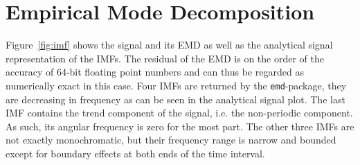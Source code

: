 \documentclass[a4paper,DIV=12,english]{scrartcl}
\begin{document}
\section{Empirical Mode Decomposition}
Figure~\ref{fig:imf} shows the signal and its EMD as well as the analytical signal representation of the IMFs. The residual of the EMD is on the order of the accuracy of 64-bit floating point numbers and can thus be regarded as numerically exact in this case. Four IMFs are returned by the \texttt{emd}-package, they are decreasing in frequency as can be seen in the analytical signal plot. The last IMF contains the trend component of the signal, i.e. the non-periodic component. As such, its angular frequency is zero for the most part. The other three IMFs are not exactly monochromatic, but their frequency range is narrow and bounded except for boundary effects at both ends of the time interval. 
\end{document}
